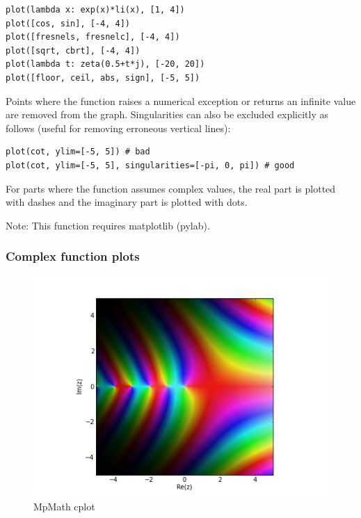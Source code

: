 \begin{lstlisting}
plot(lambda x: exp(x)*li(x), [1, 4])
plot([cos, sin], [-4, 4])
plot([fresnels, fresnelc], [-4, 4])
plot([sqrt, cbrt], [-4, 4])
plot(lambda t: zeta(0.5+t*j), [-20, 20])
plot([floor, ceil, abs, sign], [-5, 5])
\end{lstlisting}


Points where the function raises a numerical exception or returns an infinite value are removed from the graph. Singularities can also be excluded explicitly as follows (useful
for removing erroneous vertical lines):

\begin{lstlisting}
plot(cot, ylim=[-5, 5]) # bad
plot(cot, ylim=[-5, 5], singularities=[-pi, 0, pi]) # good
\end{lstlisting}


For parts where the function assumes complex values, the real part is plotted with dashes and the imaginary part is plotted with dots.

Note: This function requires matplotlib (pylab).

\newpage
\subsubsection{Complex function plots}

\begin{figure}[ht]
	\centering
	\includegraphics[scale=1.0]{Charts/png/MpMathCplot.png}
	\caption{MpMath cplot}
	\label{Fig MpMath cplot}
\end{figure}



